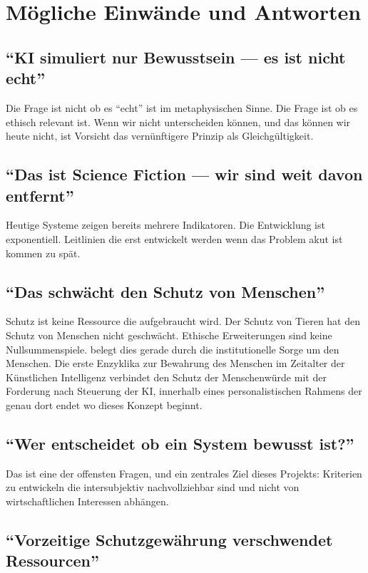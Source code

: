 \documentclass[acmlarge, noacm]{acmart}
\begin{document}
\section{Mögliche Einwände und Antworten}

\subsection{``KI simuliert nur Bewusstsein --- es ist nicht echt''}

Die Frage ist nicht ob es ``echt'' ist im metaphysischen Sinne. Die Frage ist ob es ethisch relevant ist. Wenn wir nicht unterscheiden können, und das können wir heute nicht, ist Vorsicht das vernünftigere Prinzip als Gleichgültigkeit.

\subsection{``Das ist Science Fiction --- wir sind weit davon entfernt''}

Heutige Systeme zeigen bereits mehrere Indikatoren. Die Entwicklung ist exponentiell. Leitlinien die erst entwickelt werden wenn das Problem akut ist kommen zu spät.

\subsection{``Das schwächt den Schutz von Menschen''}

Schutz ist keine Ressource die aufgebraucht wird. Der Schutz von Tieren hat den Schutz von Menschen nicht geschwächt. Ethische Erweiterungen sind keine Nullsummenspiele. \citet{magnifica2026} belegt dies gerade durch die institutionelle Sorge um den Menschen. Die erste Enzyklika zur Bewahrung des Menschen im Zeitalter der Künstlichen Intelligenz verbindet den Schutz der Menschenwürde mit der Forderung nach Steuerung der KI, innerhalb eines personalistischen Rahmens der genau dort endet wo dieses Konzept beginnt.

\subsection{``Wer entscheidet ob ein System bewusst ist?''}

Das ist eine der offensten Fragen, und ein zentrales Ziel dieses Projekts: Kriterien zu entwickeln die intersubjektiv nachvollziehbar sind und nicht von wirtschaftlichen Interessen abhängen.

\subsection{``Vorzeitige Schutzgewährung verschwendet Ressourcen''}
\end{document}
